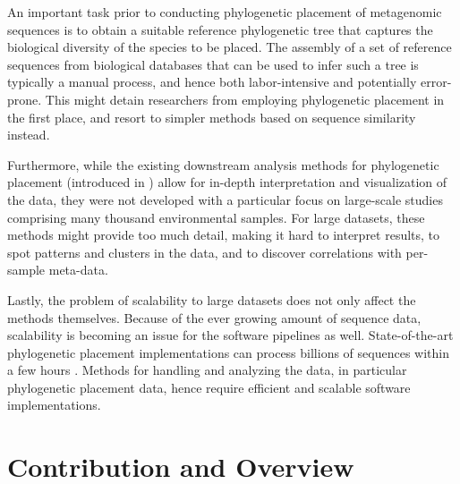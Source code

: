 An important task prior to conducting phylogenetic placement of metagenomic sequences is to obtain a suitable
reference phylogenetic tree that captures the biological diversity of the species to be placed.
The assembly of a set of reference sequences from biological databases that can be used to infer such a tree
is typically a manual process, and hence both labor-intensive and potentially error-prone.
This might detain researchers from employing phylogenetic placement in the first place,
and resort to simpler methods based on sequence similarity instead.

Furthermore, while the existing downstream analysis methods for phylogenetic placement
(introduced in )
allow for in-depth interpretation and visualization of the data,
they were not developed with a particular focus on large-scale studies comprising many thousand environmental samples.
For large datasets, these methods might provide too much detail,
making it hard to interpret results, to spot patterns and clusters in the data,
and to discover correlations with per-sample meta-data.

Lastly, the problem of scalability to large datasets does not only affect the methods themselves.
Because of the ever growing amount of sequence data,
scalability is becoming an issue for the software pipelines as well.
State-of-the-art phylogenetic placement implementations can process billions of sequences within a few hours \cite{Barbera2018}.
Methods for handling and analyzing the data, in particular phylogenetic placement data,
hence require efficient and scalable software implementations.



\section{Contribution and Overview}
\label{ch:Introduction:sec:ContributionOverview}

